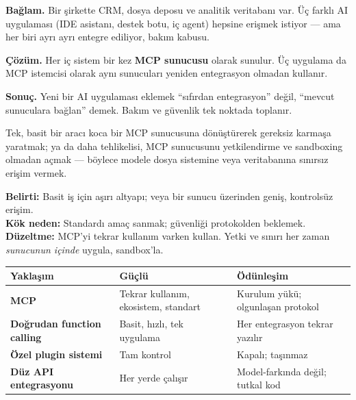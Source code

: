 \begin{prodbox}
\textbf{Bağlam.} Bir şirkette CRM, dosya deposu ve analitik veritabanı var. Üç
farklı AI uygulaması (IDE asistanı, destek botu, iç agent) hepsine erişmek
istiyor --- ama her biri ayrı ayrı entegre ediliyor, bakım kabusu.

\smallskip
\textbf{Çözüm.} Her iç sistem bir kez \textbf{MCP sunucusu} olarak sunulur.
Üç uygulama da MCP istemcisi olarak aynı sunucuları yeniden entegrasyon olmadan
kullanır.

\smallskip
\textbf{Sonuç.} Yeni bir AI uygulaması eklemek ``sıfırdan entegrasyon'' değil,
``mevcut sunuculara bağlan'' demek. Bakım ve güvenlik tek noktada toplanır.
\end{prodbox}

\begin{antibox}
Tek, basit bir aracı koca bir MCP sunucusuna dönüştürerek gereksiz karmaşa
yaratmak; ya da daha tehlikelisi, MCP sunucusunu yetkilendirme ve sandboxing
olmadan açmak --- böylece modele dosya sistemine veya veritabanına sınırsız
erişim vermek.

\smallskip
\textbf{Belirti:} Basit iş için aşırı altyapı; veya bir sunucu üzerinden geniş, kontrolsüz erişim.\\
\textbf{Kök neden:} Standardı amaç sanmak; güvenliği protokolden beklemek.\\
\textbf{Düzeltme:} MCP'yi tekrar kullanım varken kullan. Yetki ve sınırı her zaman \emph{sunucunun içinde} uygula, sandbox'la.
\end{antibox}

\vspace{2pt}
\begin{tabularx}{\linewidth}{@{}>{\raggedright\arraybackslash}p{30mm} L L@{}}
\toprule
{\sffamily\bfseries\small Yaklaşım} & {\sffamily\bfseries\small Güçlü} & {\sffamily\bfseries\small Ödünleşim} \\
\midrule
\textbf{MCP} & Tekrar kullanım, ekosistem, standart & Kurulum yükü; olgunlaşan protokol \\
\addlinespace[2pt]
\textbf{Doğrudan function calling} & Basit, hızlı, tek uygulama & Her entegrasyon tekrar yazılır \\
\addlinespace[2pt]
\textbf{Özel plugin sistemi} & Tam kontrol & Kapalı; taşınmaz \\
\addlinespace[2pt]
\textbf{Düz API entegrasyonu} & Her yerde çalışır & Model-farkında değil; tutkal kod \\
\bottomrule
\end{tabularx}

